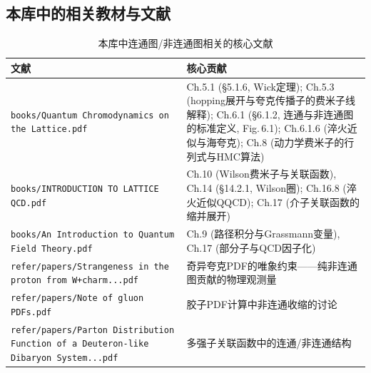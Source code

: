 \documentclass[12pt,a4paper]{ctexart}
\theoremstyle{definition}
\begin{document}
\begin{center}
\end{center}

\subsection{本库中的相关教材与文献}

\begin{table}[H]
\centering
\caption{本库中连通图/非连通图相关的核心文献}
\label{tab:cd_papers}
\small
\begin{tabular}{lp{9cm}}
\toprule
文献 & 核心贡献 \\
\midrule
\texttt{books/Quantum Chromodynamics on the Lattice.pdf} &
Ch.5.1 (\S 5.1.6, Wick定理); Ch.5.3 (hopping展开与夸克传播子的费米子线解释); Ch.6.1 (\S 6.1.2, 连通与非连通图的标准定义, Fig.\,6.1); Ch.6.1.6 (淬火近似与海夸克); Ch.8 (动力学费米子的行列式与HMC算法) \\
\texttt{books/INTRODUCTION TO LATTICE QCD.pdf} &
Ch.10 (Wilson费米子与关联函数), Ch.14 (\S 14.2.1, Wilson圈); Ch.16.8 (淬火近似QQCD); Ch.17 (介子关联函数的缩并展开) \\
\texttt{books/An Introduction to Quantum Field Theory.pdf} &
Ch.9 (路径积分与Grassmann变量), Ch.17 (部分子与QCD因子化) \\
\texttt{refer/papers/Strangeness in the proton from W+charm...pdf} &
奇异夸克PDF的唯象约束——纯非连通图贡献的物理观测量 \\
\texttt{refer/papers/Note of gluon PDFs.pdf} &
胶子PDF计算中非连通收缩的讨论 \\
\texttt{refer/papers/Parton Distribution Function of a Deuteron-like Dibaryon System...pdf} &
多强子关联函数中的连通/非连通结构 \\
\bottomrule
\end{tabular}
\end{table}
\end{document}

